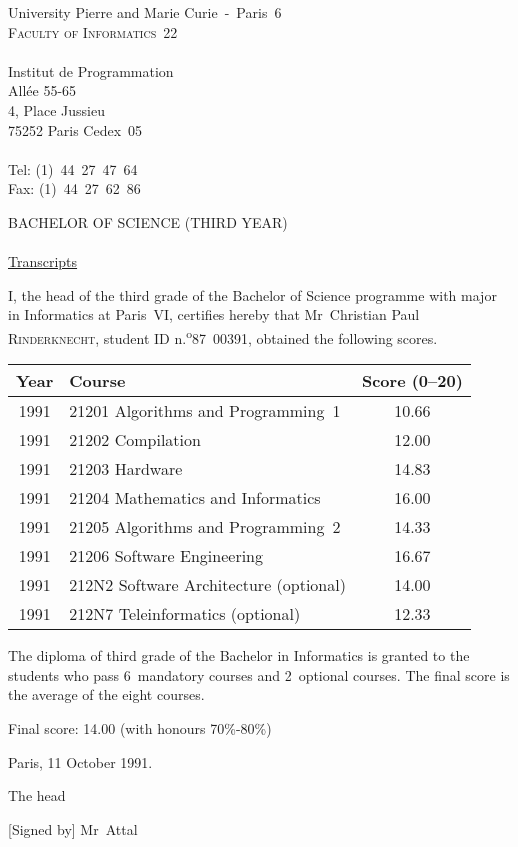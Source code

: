\documentclass[a4paper,11pt,twoside]{article}
\begin{document}
\thispagestyle{empty}

\begin{flushleft}
University Pierre and Marie Curie~-~Paris~6\\
\textsc{Faculty of Informatics~22}\\
\ \\
Institut de Programmation\\
All\'ee 55-65\\
4, Place Jussieu\\
75252 Paris Cedex~05\\
\ \\
Tel: (1)~44~27~47~64\\
Fax: (1)~44~27~62~86
\end{flushleft}

\bigskip\bigskip\bigskip

\begin{center}
\textsc{\Large BACHELOR OF SCIENCE (THIRD YEAR)}\\
\ \\
\underline{\Large Transcripts}
\end{center}

\bigskip\bigskip\bigskip

I, the head of the third grade of the Bachelor of Science programme
with major in Informatics at Paris~VI, certifies hereby that
Mr~Christian Paul \textsc{Rinderknecht}, student ID
n.\kern-0.5bp\textsuperscript{o}87~00391, obtained the following
scores.

\bigskip

\begin{center}
\begin{tabular}{@{}|c|l|c|@{}}
\hline
Year & Course & Score (0--20)\\
\hline
1991 & 21201 Algorithms and Programming~1 & 10.66\\
\hline
1991 & 21202 Compilation & 12.00\\
\hline
1991 & 21203 Hardware & 14.83\\
\hline
1991 & 21204 Mathematics and Informatics & 16.00\\
\hline
1991 & 21205 Algorithms and Programming~2 & 14.33\\
\hline
1991 & 21206 Software Engineering & 16.67\\
\hline
1991 & 212N2 Software Architecture ({\small optional}) & 14.00\\
\hline
1991 & 212N7 Teleinformatics ({\small optional}) & 12.33\\
\hline
\end{tabular}
\end{center}

\bigskip

The diploma of third grade of the Bachelor in Informatics is granted
to the students who pass 6~mandatory courses and 2~optional
courses. The final score is the average of the eight courses.

\bigskip
Final score: 14.00 (with honours 70\%-80\%)
\bigskip

Paris, 11 October 1991.

\bigskip

The head\\

\medskip

[Signed by] Mr~Attal
\end{document}
